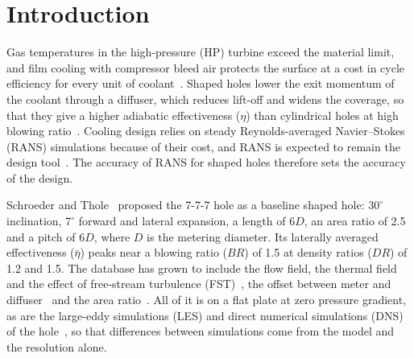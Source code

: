 \documentclass[colorlinks,upint,subscriptcorrection,varvw,hyphenate,balance,lineno]{asmeconf}
\newcommand*{\BR}{\mathit{BR}}
\newcommand*{\DR}{\mathit{DR}}
\newcommand*{\etab}{\bar\eta}
\begin{document}

\section{Introduction}\label{sec:intro}

Gas temperatures in the high-pressure (HP) turbine exceed the material limit, and film cooling with compressor
bleed air protects the surface at a cost in cycle efficiency for every unit of coolant~\cite{bogard2006}. Shaped
holes lower the exit momentum of the coolant through a diffuser, which reduces lift-off and widens the coverage,
so that they give a higher adiabatic effectiveness ($\eta$) than cylindrical holes at high blowing
ratio~\cite{gritsch1998,thole1998,saumweber2003}. Cooling design relies on steady Reynolds-averaged
Navier--Stokes (RANS) simulations because of their cost, and RANS is expected to remain the design
tool~\cite{milani2017,milani2020}. The accuracy of RANS for shaped holes therefore sets the accuracy of the
design.

Schroeder and Thole~\cite{schroeder2014} proposed the 7-7-7 hole as a baseline shaped hole: $30^\circ$
inclination, $7^\circ$ forward and lateral expansion, a length of $6D$, an area ratio of 2.5 and a pitch of $6D$,
where $D$ is the metering diameter. Its laterally averaged effectiveness ($\etab$) peaks near a blowing ratio
($\BR$) of 1.5 at density ratios ($\DR$) of 1.2 and 1.5. The database has grown to include the flow field, the
thermal field and the effect of free-stream turbulence (FST)~\cite{schroeder2016,schroeder2016b}, the offset
between meter and diffuser~\cite{haydt2017} and the area ratio~\cite{haydt2018}. All of it is on a flat plate at
zero pressure gradient, as are the large-eddy simulations (LES) and direct numerical simulations (DNS) of the
hole~\cite{oliver2017,nunno2022,bin2024}, so that differences between simulations come from the model and the
resolution alone.
\end{document}
